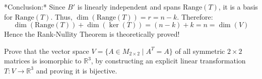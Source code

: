 \documentclass[11pt,a4paper]{article}
\begin{document}
\begin{solutionbox}
*Conclusion:* Since $B'$ is linearly independent and spans $\text{Range}(T)$, it is a basis for $\text{Range}(T)$.
Thus, $\dim(\text{Range}(T)) = r = n - k$.
Therefore:
\[ \dim(\text{Range}(T)) + \dim(\ker(T)) = (n - k) + k = n = \dim(V) \]
Hence the Rank-Nullity Theorem is theoretically proved!
\end{solutionbox}

\vspace{0.8cm}

\begin{questionbox}
Prove that the vector space $V = \{ A \in M_{2 \times 2} \mid A^T = A \}$ of all symmetric $2 \times 2$ matrices is isomorphic to $\mathbb{R}^3$, by constructing an explicit linear transformation $T: V \to \mathbb{R}^3$ and proving it is bijective.
\end{questionbox}
\end{document}
